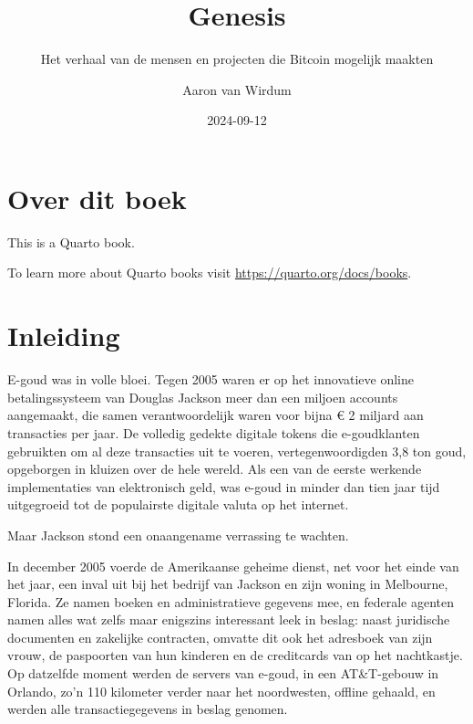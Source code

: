 \documentclass[
  a5paper,
  smalldemyvopaper,11pt,twoside,onecolumn,openright,extrafontsizes]{memoir}
\title{Genesis}
\subtitle{Het verhaal van de mensen en projecten die Bitcoin mogelijk
maakten}
\author{Aaron van Wirdum}
\date{2024-09-12}
\renewcommand*\contentsname{Table of contents}
\newcommand\contentsname{Table of contents}
\begin{document}
\frontmatter
\maketitle

\renewcommand*\contentsname{Table of contents}
{
\hypersetup{linkcolor=}
\setcounter{tocdepth}{2}
\tableofcontents
}

\mainmatter
{}

\chapter*{Over dit boek}\label{over-dit-boek}


This is a Quarto book.

To learn more about Quarto books visit
\url{https://quarto.org/docs/books}.


\chapter*{Inleiding}\label{inleiding}


E-goud was in volle bloei. Tegen 2005 waren er op het innovatieve online
betalingssysteem van Douglas Jackson meer dan een miljoen accounts
aangemaakt, die samen verantwoordelijk waren voor bijna € 2 miljard aan
transacties per jaar. De volledig gedekte digitale tokens die
e-goudklanten gebruikten om al deze transacties uit te voeren,
vertegenwoordigden 3,8 ton goud, opgeborgen in kluizen over de hele
wereld. Als een van de eerste werkende implementaties van elektronisch
geld, was e-goud in minder dan tien jaar tijd uitgegroeid tot de
populairste digitale valuta op het internet.

Maar Jackson stond een onaangename verrassing te wachten.

In december 2005 voerde de Amerikaanse geheime dienst, net voor het
einde van het jaar, een inval uit bij het bedrijf van Jackson en zijn
woning in Melbourne, Florida. Ze namen boeken en administratieve
gegevens mee, en federale agenten namen alles wat zelfs maar enigszins
interessant leek in beslag: naast juridische documenten en zakelijke
contracten, omvatte dit ook het adresboek van zijn vrouw, de paspoorten
van hun kinderen en de creditcards van op het nachtkastje. Op datzelfde
moment werden de servers van e-goud, in een AT\&T-gebouw in Orlando,
zo'n 110 kilometer verder naar het noordwesten, offline gehaald, en
werden alle transactiegegevens in beslag genomen.
\end{document}
